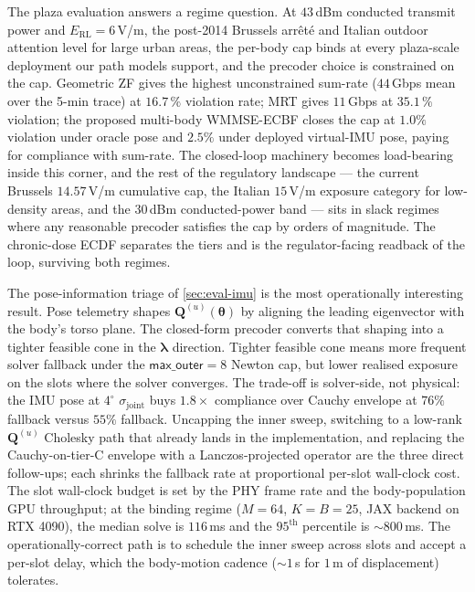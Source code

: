 \documentclass[journal,twocolumn,10pt]{IEEEtran}
\theoremstyle{plain}
\theoremstyle{remark}
\newcommand{\Qmat}{\mathbf{Q}}
\begin{document}
The plaza evaluation answers a regime question. At $43\,$dBm
conducted transmit power and $E_{\mathrm{RL}} = 6\,$V/m, the
post-2014 Brussels arr\^et\'e and Italian outdoor attention level
for large urban areas, the per-body cap binds at every plaza-scale
deployment our path models support, and the precoder choice is
constrained on the cap. Geometric ZF gives the highest
unconstrained sum-rate ($44\,$Gbps mean over the 5-min trace) at
$16.7\,\%$ violation rate; MRT gives $11\,$Gbps at $35.1\,\%$
violation; the proposed multi-body WMMSE-ECBF closes the cap at
$1.0\%$ violation under oracle pose and $2.5\%$ under deployed
virtual-IMU pose, paying for compliance with sum-rate. The
closed-loop machinery becomes load-bearing inside this corner, and
the rest of the regulatory landscape — the current Brussels
$14.57\,$V/m cumulative cap, the Italian $15\,$V/m exposure
category for low-density areas, and the $30\,$dBm conducted-power
band — sits in slack regimes where any reasonable precoder satisfies
the cap by orders of magnitude. The chronic-dose ECDF separates the
tiers and is the regulator-facing readback of the loop, surviving
both regimes.

The pose-information triage of \cref{sec:eval-imu} is the most
operationally interesting result. Pose telemetry shapes
$\Qmat^{(u)}(\bm\theta)$ by aligning the leading eigenvector with
the body's torso plane. The closed-form precoder converts that
shaping into a tighter feasible cone in the $\bm\lambda$ direction.
Tighter feasible cone means more frequent solver fallback under the
$\textsf{max\_outer} = 8$ Newton cap, but lower realised exposure
on the slots where the solver converges. The trade-off is
solver-side, not physical: the IMU pose at $4^\circ$
$\sigma_{\mathrm{joint}}$ buys $1.8\times$ compliance over Cauchy
envelope at $76\%$ fallback versus $55\%$ fallback. Uncapping the
inner sweep, switching to a low-rank $\Qmat^{(u)}$ Cholesky path
that already lands in the implementation, and replacing the
Cauchy-on-tier-C envelope with a Lanczos-projected operator are
the three direct follow-ups; each shrinks the fallback rate at
proportional per-slot wall-clock cost. The slot wall-clock budget
is set by the PHY frame rate and the body-population GPU
throughput; at the binding regime ($M = 64$, $K = B = 25$, JAX
backend on RTX 4090), the median solve is $116\,$ms and the
$95^{\mathrm{th}}$ percentile is $\sim 800\,$ms. The
operationally-correct path is to schedule the inner sweep
across slots and accept a per-slot delay, which the body-motion
cadence ($\sim 1\,$s for $1\,$m of displacement) tolerates.
\end{document}
